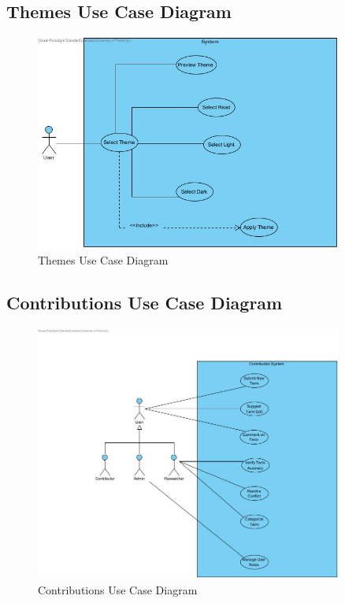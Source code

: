 \documentclass[12pt]{article}
\begin{document}
\subsection{Themes Use Case Diagram}
\begin{figure}[H]
  \centering
  \includegraphics[width=0.9\textwidth]{Themes_UseCase.jpg}
  \caption{Themes Use Case Diagram}
  \label{fig:themes-use-case}
\end{figure}

\subsection{Contributions Use Case Diagram}
\begin{figure}[H]
  \centering
  \includegraphics[width=0.9\textwidth]{Contributions.jpg}
  \caption{Contributions Use Case Diagram}
  \label{fig:contributions-use-case}
\end{figure}
\end{document}
